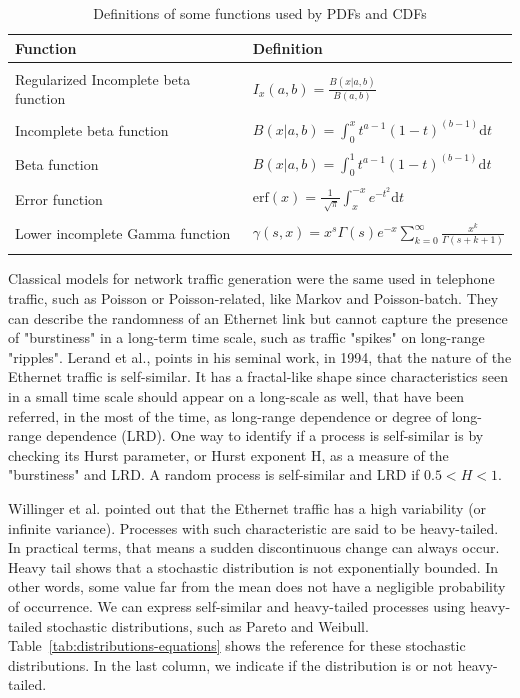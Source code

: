 \begin{table}[t!]
\centering
\caption{Definitions of some functions used by PDFs and CDFs}
\label{tab:distributions-definitions}
\begin{tabular}{ll}
\hline
Function                             & Definition \\ 
\hline
\\
Regularized Incomplete beta function & $ I_{x}(a, b) = \frac{B(x| a, b)}{B(a, b)} $           \\
\\
Incomplete beta function             & $ B(x| a, b) = \int_{0}^{x} t^{a - 1} (1 - t)^{(b - 1)} \text{d}t $           \\
\\
Beta function                        & $ B(x| a, b) = \int_{0}^{1} t^{a - 1} (1 - t)^{(b - 1)} \text{d}t $           \\
\\
Error function                       & $ \text{erf}(x) = \frac{1}{\sqrt[]{\pi}}\int_{x}^{-x} e^{-t^{2}} \text{d}t $           \\ 
\\
Lower incomplete Gamma function      & $ \gamma(s, x) = x^{s}\Gamma(s)e^{-x}\sum_{k = 0}^{\infty}\frac{x^{k}}{\Gamma(s+k+1)} $  \\
\\
\hline
\end{tabular}
\end{table}


Classical models for network traffic generation were the same used in telephone traffic, such as  Poisson or Poisson-related, like Markov and Poisson-batch. They can describe the randomness of an Ethernet link but cannot capture the presence of "burstiness" in a long-term time scale, such as traffic "spikes" on long-range "ripples". Lerand et al.\cite{selfsimilar-ethernet}, points in his seminal work, in 1994, that the nature of the Ethernet traffic is self-similar. It has a fractal-like shape since characteristics seen in a small time scale should appear on a long-scale as well, that have been referred, in the most of the time, as long-range dependence or degree of long-range dependence (LRD). One way to identify if a process is self-similar is by checking its Hurst parameter, or Hurst exponent H, as a measure of the "burstiness" and LRD.  A random process is self-similar and LRD if $0.5 < H <1$\cite{stochastic-selfsimilar}. 

Willinger et al. pointed out that the Ethernet traffic has a high variability (or infinite variance)\cite{selfsimilar-highvariability}.  Processes with such characteristic are said to be heavy-tailed. In practical terms, that means a sudden discontinuous change can always occur. Heavy tail shows that a stochastic distribution is not exponentially bounded. In other words, some value far from the mean does not have a negligible probability of occurrence. We can express self-similar and heavy-tailed processes using heavy-tailed stochastic distributions, such as Pareto and Weibull. Table~\ref{tab:distributions-equations} shows the reference for these stochastic distributions. In the last column, we indicate if the distribution is or not heavy-tailed. 

